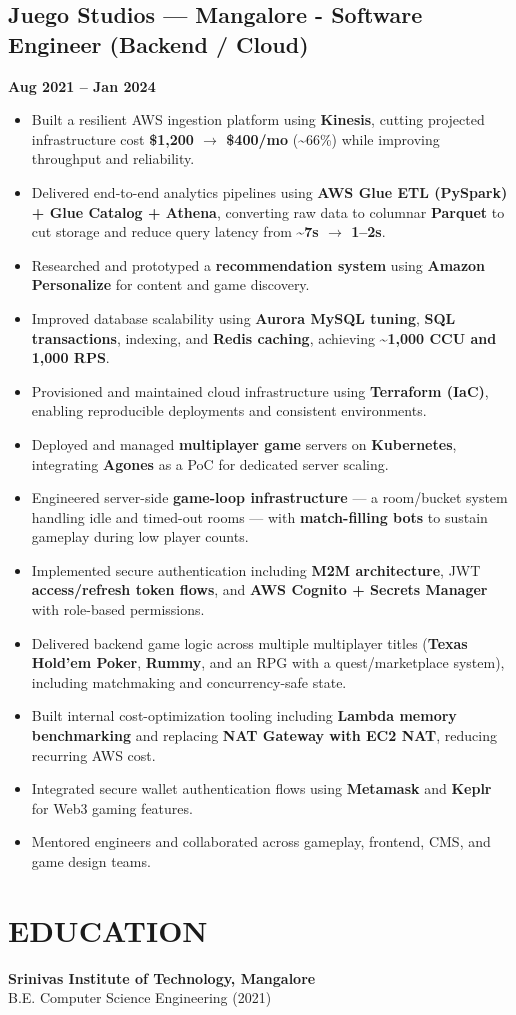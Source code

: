 \documentclass[a4paper,10pt]{article}
\begin{document}
\subsection*{{\color{accent}Juego Studios --- Mangalore} \textnormal{-} Software Engineer (Backend / Cloud)}
\textbf{Aug 2021 -- Jan 2024}
\begin{itemize}
  \item Built a resilient AWS ingestion platform using \textbf{Kinesis}, cutting projected infrastructure cost \textbf{\$1,200 $\rightarrow$ \$400/mo} (\textasciitilde{}66\%) while improving throughput and reliability.
  \item Delivered end-to-end analytics pipelines using \textbf{AWS Glue ETL (PySpark) + Glue Catalog + Athena}, converting raw data to columnar \textbf{Parquet} to cut storage and reduce query latency from \textbf{\textasciitilde{}7s $\rightarrow$ 1--2s}.
  \item Researched and prototyped a \textbf{recommendation system} using \textbf{Amazon Personalize} for content and game discovery.
  \item Improved database scalability using \textbf{Aurora MySQL tuning}, \textbf{SQL transactions}, indexing, and \textbf{Redis caching}, achieving \textbf{\textasciitilde{}1,000 CCU and 1,000 RPS}.
  \item Provisioned and maintained cloud infrastructure using \textbf{Terraform (IaC)}, enabling reproducible deployments and consistent environments.
  \item Deployed and managed \textbf{multiplayer game} servers on \textbf{Kubernetes}, integrating \textbf{Agones} as a PoC for dedicated server scaling.
  \item Engineered server-side \textbf{game-loop infrastructure} --- a room/bucket system handling idle and timed-out rooms --- with \textbf{match-filling bots} to sustain gameplay during low player counts.
  \item Implemented secure authentication including \textbf{M2M architecture}, JWT \textbf{access/refresh token flows}, and \textbf{AWS Cognito + Secrets Manager} with role-based permissions.
  \item Delivered backend game logic across multiple multiplayer titles (\textbf{Texas Hold'em Poker}, \textbf{Rummy}, and an RPG with a quest/marketplace system), including matchmaking and concurrency-safe state.
  \item Built internal cost-optimization tooling including \textbf{Lambda memory benchmarking} and replacing \textbf{NAT Gateway with EC2 NAT}, reducing recurring AWS cost.
  \item Integrated secure wallet authentication flows using \textbf{Metamask} and \textbf{Keplr} for Web3 gaming features.
  \item Mentored engineers and collaborated across gameplay, frontend, CMS, and game design teams.
\end{itemize}

\section*{EDUCATION}
\textbf{Srinivas Institute of Technology, Mangalore}\\
B.E. Computer Science Engineering (2021)
\end{document}
